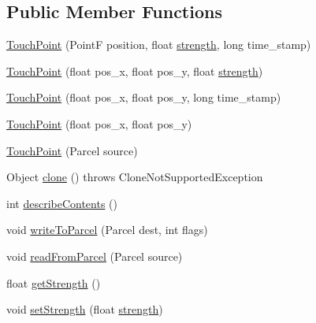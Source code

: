 \subsection*{Public Member Functions}
\begin{DoxyCompactItemize}
\item 
\hyperlink{classch_1_1zhaw_1_1ba10__bsha__1_1_1TouchPoint_a78cfb1506a0081d1e3175fde400290de}{TouchPoint} (PointF position, float \hyperlink{classch_1_1zhaw_1_1ba10__bsha__1_1_1TouchPoint_ad245f48693fecee2b25f3c5e7e1976a8}{strength}, long time\_\-stamp)
\item 
\hyperlink{classch_1_1zhaw_1_1ba10__bsha__1_1_1TouchPoint_a56ef62d0be5dbcd46be0d65ea13e48b3}{TouchPoint} (float pos\_\-x, float pos\_\-y, float \hyperlink{classch_1_1zhaw_1_1ba10__bsha__1_1_1TouchPoint_ad245f48693fecee2b25f3c5e7e1976a8}{strength})
\item 
\hyperlink{classch_1_1zhaw_1_1ba10__bsha__1_1_1TouchPoint_ad3f4dd64b5c48581bd65cd2d777a1b96}{TouchPoint} (float pos\_\-x, float pos\_\-y, long time\_\-stamp)
\item 
\hyperlink{classch_1_1zhaw_1_1ba10__bsha__1_1_1TouchPoint_a17cb410a388f8ca317ac65f981eac6ec}{TouchPoint} (float pos\_\-x, float pos\_\-y)
\item 
\hyperlink{classch_1_1zhaw_1_1ba10__bsha__1_1_1TouchPoint_ad882a2ee5e211bfefaa73c1322cf1823}{TouchPoint} (Parcel source)
\item 
Object \hyperlink{classch_1_1zhaw_1_1ba10__bsha__1_1_1TouchPoint_ac71c9f7fa232435af2314d0d707e7559}{clone} ()  throws CloneNotSupportedException 
\item 
int \hyperlink{classch_1_1zhaw_1_1ba10__bsha__1_1_1TouchPoint_ad5596f285f8ff8daf89cf36f4074df0f}{describeContents} ()
\item 
void \hyperlink{classch_1_1zhaw_1_1ba10__bsha__1_1_1TouchPoint_a8cfc22332015bceee96d2fdafc321290}{writeToParcel} (Parcel dest, int flags)
\item 
void \hyperlink{classch_1_1zhaw_1_1ba10__bsha__1_1_1TouchPoint_a23cc1e796d80c3fb6b7ca66fcecdd01e}{readFromParcel} (Parcel source)
\item 
float \hyperlink{classch_1_1zhaw_1_1ba10__bsha__1_1_1TouchPoint_a2297107f0bc05baf381fc9b8653a6df2}{getStrength} ()
\item 
void \hyperlink{classch_1_1zhaw_1_1ba10__bsha__1_1_1TouchPoint_acccafc087a2fd76987d8f829390626d7}{setStrength} (float \hyperlink{classch_1_1zhaw_1_1ba10__bsha__1_1_1TouchPoint_ad245f48693fecee2b25f3c5e7e1976a8}{strength})
\item 

\end{DoxyCompactItemize}

